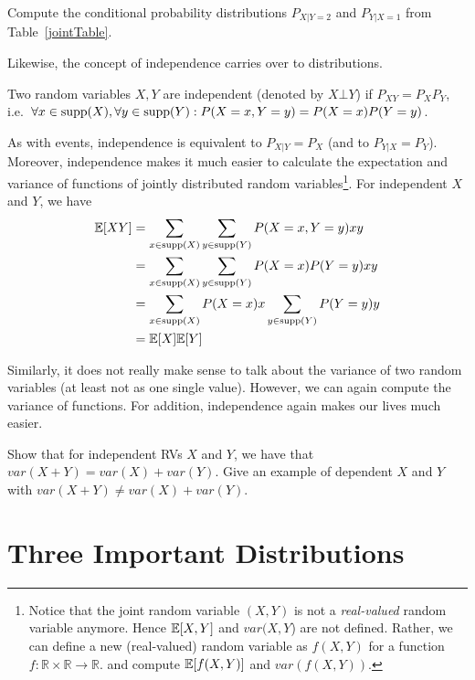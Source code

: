 \begin{Exercise}
Compute the conditional probability distributions $ P_{X|Y=2} $ and $ P_{Y|X=1} $ from Table~\ref{jointTable}.
\end{Exercise}

Likewise, the concept of independence carries over to distributions.

\begin{Definition}
Two random variables $ X,Y $ are independent (denoted by $ X \bot Y $)
if $P_{XY} = P_X P_Y$, i.e.\ $\forall x \in \operatorname{supp}(X), \forall y \in \operatorname{supp}(Y): P(X=x, Y=y) = P(X=x)P(Y=y) $.
\end{Definition}

As with events, independence is equivalent to $ P_{X|Y} = P_{X} $ (and
to $P_{Y|X}=P_Y$). Moreover, independence makes it much easier to calculate the expectation and variance of functions of jointly distributed random variables\footnote{Notice that the joint random variable $(X,Y)$ is not a \emph{real-valued} random variable anymore. Hence $\mathbb{E}[X,Y]$ and $var(X,Y$) are not defined. Rather, we can define a new (real-valued) random variable as $f(X,Y)$ for a function $f: \mathbb{R} \times \mathbb{R} \rightarrow \mathbb{R}$. and compute $\mathbb{E}[f(X,Y)]$ and $var(f(X,Y))$.}. For independent $X$ and $Y$, we have
\begin{align}
\mathbb{E}[XY] &= \sum_{x \in \operatorname{supp}(X)} \sum_{y \in \operatorname{supp}(Y)} P(X=x,Y=y) x y \\
&= \sum_{x \in \operatorname{supp}(X)} \sum_{y \in \operatorname{supp}(Y)} P(X=x)P(Y=y) x y \\
&= \sum_{x \in \operatorname{supp}(X)} P(X=x)x \sum_{y \in \operatorname{supp}(Y)}  P(Y=y) y \\
&= \mathbb{E}[X]\mathbb{E}[Y]
\end{align}

Similarly, it does not really make sense to talk about the variance of two random variables (at least not as one single
value). However, we can again compute the variance of functions. For addition, independence again makes our lives
much easier.

\begin{Exercise}
Show that for independent RVs $X$ and $Y$, we have that $ var(X + Y) =
var(X) + var(Y) $. Give an example of dependent $X$ and $Y$ with $ var(X + Y) \neq
var(X) + var(Y) $.
\end{Exercise}



\section{Three Important Distributions}

